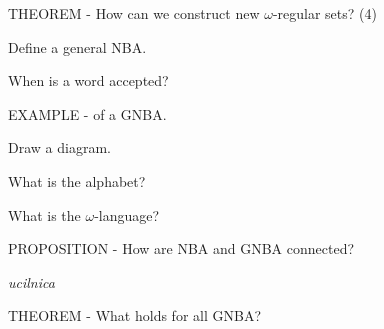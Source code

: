 \documentclass[fleqn]{article}
\begin{document}
\begin{enumerate}
    {\color{red}\item THEOREM - How can we construct new $\omega$-regular sets? (4)}
    {\color{red}\item Define a general NBA.}
    {\color{red}\item When is a word accepted?}
    \item EXAMPLE - of a GNBA.
    \begin{itemize}
        {\color{red}\item Draw a diagram.}
        \item What is the alphabet?
        {\color{red}\item What is the $\omega$-language?}
    \end{itemize}
    {\color{red}\item PROPOSITION - How are NBA and GNBA connected?} \textit{ucilnica}
    {\color{red}\item THEOREM - What holds for all GNBA?}
\end{enumerate}
\end{document}
